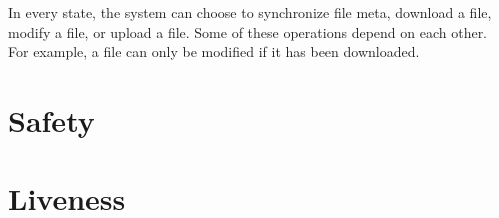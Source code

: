 In every state, the system can choose to synchronize file meta, download a file,
modify a file, or upload a file. Some of these operations depend on each other.
For example, a file can only be modified if it has been downloaded.\\ 

\section{Safety}

\section{Liveness}

% 

